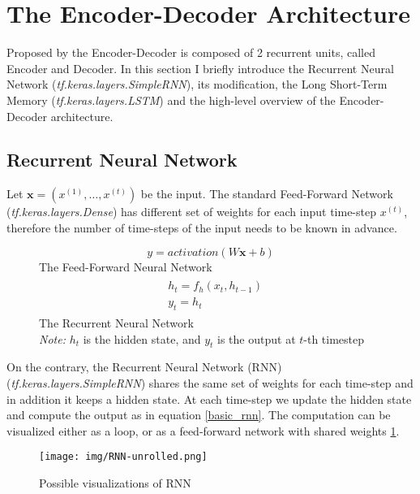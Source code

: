 \section {The Encoder-Decoder Architecture}

Proposed by \citep{sutskever2014sequence} the Encoder-Decoder is composed of 2 recurrent units, called Encoder and Decoder. In this section I briefly introduce the Recurrent Neural Network (\emph{tf.keras.layers.SimpleRNN}), its modification, the Long Short-Term Memory (\emph{tf.keras.layers.LSTM}) \citep{hochreiter1997} and the high-level overview of the Encoder-Decoder architecture.

\subsection{Recurrent Neural Network}

Let $\mathbf{x}=(x^{(1)},\dots,x^{(t)})$ be the input. The standard Feed-Forward Network (\emph{tf.keras.layers.Dense}) has different set of weights for each input time-step $x^{(t)}$, therefore the number of time-steps of the input needs to be known in advance.

\begin{figure}[!h]
\centering
\begin{equation}
y = activation(W\mathbf{x} + b)
\end{equation}
The Feed-Forward Neural Network
\begin{align} \label{basic_rnn}
\begin{split}
    &h_t = f_h(x_t, h_{t-1}) \\
    &y_t = h_t
\end{split}
\end{align}
The Recurrent Neural Network \\
\footnotesize{\textit{Note:} $h_t$ is the hidden state, and $y_t$ is the output at $t$-th timestep}
\end{figure}
On the contrary, the Recurrent Neural Network (RNN) \citep{rumelhart_rnn1988} (\emph{tf.keras.layers.SimpleRNN}) shares the same set of weights for each time-step and in addition it keeps a hidden state. At each time-step we update the hidden state and compute the output as in equation \ref{basic_rnn}. The computation can be visualized either as a loop, or as a feed-forward network with shared weights \ref{vis_rnn}.


\begin{figure}[!h]
    \texttt{[image: img/RNN-unrolled.png]}
    \caption{Possible visualizations of RNN \citep{Olah2015}} \label{vis_rnn}
\end{figure}

